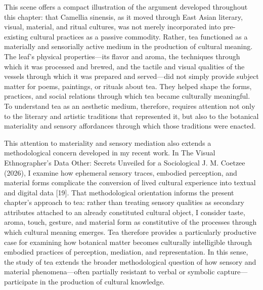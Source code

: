 \documentclass[11pt,a4paper]{article}
\begin{document}
This scene offers a compact illustration of the argument developed throughout this chapter: that Camellia sinensis, as it moved through East Asian literary, visual, material, and ritual cultures, was not merely incorporated into pre-existing cultural practices as a passive commodity. Rather, tea functioned as a materially and sensorially active medium in the production of cultural meaning. The leaf's physical properties---its flavor and aroma, the techniques through which it was processed and brewed, and the tactile and visual qualities of the vessels through which it was prepared and served---did not simply provide subject matter for poems, paintings, or rituals about tea. They helped shape the forms, practices, and social relations through which tea became culturally meaningful. To understand tea as an aesthetic medium, therefore, requires attention not only to the literary and artistic traditions that represented it, but also to the botanical materiality and sensory affordances through which those traditions were enacted.

This attention to materiality and sensory mediation also extends a methodological concern developed in my recent work. In The Visual Ethnographer's Data Other: Secrets Unveiled for a Sociological J. M. Coetzee (2026), I examine how ephemeral sensory traces, embodied perception, and material forms complicate the conversion of lived cultural experience into textual and digital data [19]. That methodological orientation informs the present chapter's approach to tea: rather than treating sensory qualities as secondary attributes attached to an already constituted cultural object, I consider taste, aroma, touch, gesture, and material form as constitutive of the processes through which cultural meaning emerges. Tea therefore provides a particularly productive case for examining how botanical matter becomes culturally intelligible through embodied practices of perception, mediation, and representation. In this sense, the study of tea extends the broader methodological question of how sensory and material phenomena---often partially resistant to verbal or symbolic capture---participate in the production of cultural knowledge.
\end{document}

